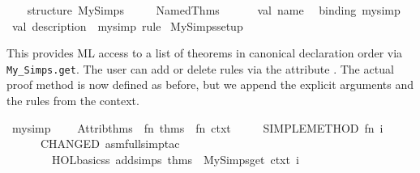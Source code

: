 \begin{isabellebody}
\isamarkuptrue%
%
\isadelimML
%
\endisadelimML
%
\isatagML
{}\isamarkupfalse%
\ {}\isanewline
\ \ structure\ My{}Simps\ {}\isanewline
\ \ \ \ Named{}Thms\isanewline
\ \ \ \ \ \ {}val\ name\ {}\ %
\isaantiq
binding\ my{}simp{}%
\endisaantiq
\ val\ description\ {}\ {}my{}simp\ rule{}{}\isanewline
{}\isanewline
{}\isamarkupfalse%
\ My{}Simps{}setup%
\endisatagML
{\isafoldML}%
%
\isadelimML
%
\endisadelimML
%
\begin{isamarkuptext}%
This provides ML access to a list of theorems in canonical
  declaration order via \verb|My_Simps.get|.  The user can add or
  delete rules via the attribute \hyperlink{attribute.my-simp}{\mbox{}}.  The actual
  proof method is now defined as before, but we append the explicit
  arguments and the rules from the context.%
\end{isamarkuptext}%
\isamarkuptrue%
%
\isadelimML
%
\endisadelimML
%
\isatagML
{}\isamarkupfalse%
\ my{}simp{}\ {}\ {}\isanewline
\ \ Attrib{}thms\ {}{}\ {}fn\ thms\ {}{}\ fn\ ctxt\ {}{}\isanewline
\ \ \ \ SIMPLE{}METHOD{}\ {}fn\ i\ {}{}\isanewline
\ \ \ \ \ \ CHANGED\ {}asm{}full{}simp{}tac\isanewline
\ \ \ \ \ \ \ \ {}HOL{}basic{}ss\ addsimps\ {}thms\ {}\ My{}Simps{}get\ ctxt{}{}\ i{}{}{}\isanewline

\end{isabellebody}
